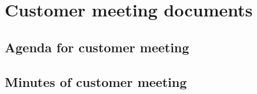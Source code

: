 \chapter{Customer meeting documents}
\label{AppendixE}

\section{Agenda for customer meeting}

\section{Minutes of customer meeting}
